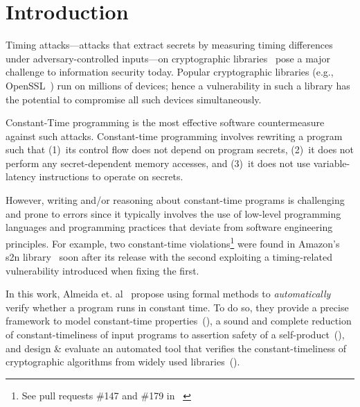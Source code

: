 \section{Introduction}

Timing attacks---attacks that extract secrets by measuring timing differences under adversary-controlled inputs---on cryptographic libraries~\cite{bernstein_cache_timing_attacks, dsa_exponentiations} pose a major challenge to information security today.
Popular cryptographic libraries (e.g., OpenSSL~\cite{openssl}) run on millions of devices; hence a vulnerability in such a library has the potential to compromise all such devices simultaneously.

Constant-Time programming is the most effective software countermeasure against such attacks.
Constant-time programming involves rewriting a program such that (1)~its control flow does not depend on program secrets, (2)~it does not perform any secret-dependent memory accesses, and (3)~it does not use variable-latency instructions to operate on secrets.

However, writing and/or reasoning about constant-time programs is challenging and prone to errors since it typically involves the use of low-level programming languages and programming practices that deviate from software engineering principles.
For example, two constant-time violations\footnote{See pull requests \#147 and \#179 in ~\cite{s2n}} were found in Amazon's s2n library~\cite{s2n} soon after its release with the second exploiting a timing-related vulnerability introduced when fixing the first.

In this work, Almeida et. al~\cite{almeida} propose using formal methods to \emph{automatically} verify whether a program runs in constant time.
To do so, they provide a precise framework to model constant-time properties~(), a sound and complete reduction of constant-timeliness of input programs to assertion safety of a self-product~(), and design \& evaluate an automated tool that verifies the constant-timeliness of cryptographic algorithms from widely used libraries~().
